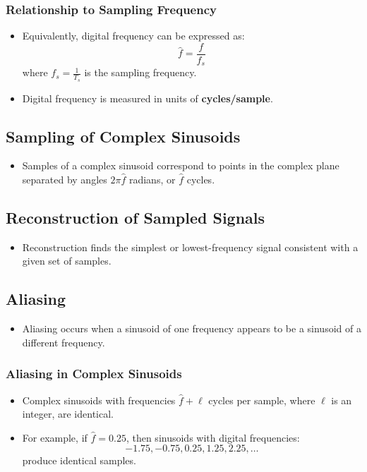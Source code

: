 \documentclass[12pt, letterpaper]{article}
\begin{document}
\subsubsection{Relationship to Sampling Frequency}
\begin{itemize}
    \item Equivalently, digital frequency can be expressed as:
    \[
    \hat{f} = \frac{f}{f_s}
    \]
    where \( f_s = \frac{1}{T_s} \) is the sampling frequency.
    \item Digital frequency is measured in units of \textbf{cycles/sample}.
\end{itemize}

\subsection{Sampling of Complex Sinusoids}
\begin{itemize}
    \item Samples of a complex sinusoid correspond to points in the complex plane separated by angles \( 2\pi \hat{f} \) radians, or \( \hat{f} \) cycles.
\end{itemize}

\subsection{Reconstruction of Sampled Signals}
\begin{itemize}
    \item Reconstruction finds the simplest or lowest-frequency signal consistent with a given set of samples.
\end{itemize}

\subsection{Aliasing}
\begin{itemize}
    \item Aliasing occurs when a sinusoid of one frequency appears to be a sinusoid of a different frequency.
\end{itemize}

\subsubsection{Aliasing in Complex Sinusoids}
\begin{itemize}
    \item Complex sinusoids with frequencies \( \hat{f} + \ell \) cycles per sample, where \( \ell \) is an integer, are identical.
    \item For example, if \( \hat{f} = 0.25 \), then sinusoids with digital frequencies:
    \[
    -1.75, -0.75, 0.25, 1.25, 2.25, \dots
    \]
    produce identical samples.
\end{itemize}
\end{document}
